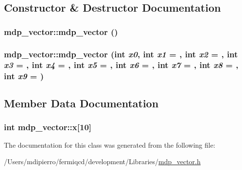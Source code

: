 \subsection{Constructor \& Destructor Documentation}
\hypertarget{classmdp__vector_a5be7b2dcf1da5df366175d5d02116cf4}{
\subsubsection[{mdp\_\-vector}]{\setlength{\rightskip}{0pt plus 5cm}mdp\_\-vector::mdp\_\-vector ()}}
\label{classmdp__vector_a5be7b2dcf1da5df366175d5d02116cf4}
\hypertarget{classmdp__vector_a2329077b47bdadc32142aa6c2788ad6f}{
\subsubsection[{mdp\_\-vector}]{\setlength{\rightskip}{0pt plus 5cm}mdp\_\-vector::mdp\_\-vector (int {\em x0}, \/  int {\em x1} = {}, \/  int {\em x2} = {}, \/  int {\em x3} = {}, \/  int {\em x4} = {}, \/  int {\em x5} = {}, \/  int {\em x6} = {}, \/  int {\em x7} = {}, \/  int {\em x8} = {}, \/  int {\em x9} = {})}}
\label{classmdp__vector_a2329077b47bdadc32142aa6c2788ad6f}


\subsection{Member Data Documentation}
\hypertarget{classmdp__vector_ae8332afc86ad8644e393657da2f109e4}{
\subsubsection[{x}]{\setlength{\rightskip}{0pt plus 5cm}int {\bf mdp\_\-vector::x}\mbox{[}10\mbox{]}}}
\label{classmdp__vector_ae8332afc86ad8644e393657da2f109e4}


The documentation for this class was generated from the following file:\begin{DoxyCompactItemize}
\item 
/Users/mdipierro/fermiqcd/development/Libraries/\hyperlink{mdp__vector_8h}{mdp\_\-vector.h}\end{DoxyCompactItemize}

